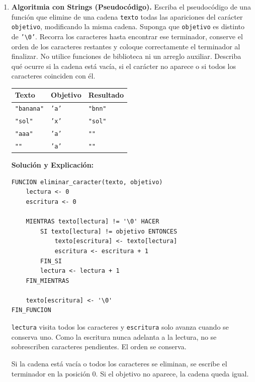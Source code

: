 \documentclass[11pt,letterpaper]{article}
\begin{document}
\begin{enumerate}[label=\textbf{\arabic*.}]
\begin{solucionbox}
    \textbf{Salida exacta:}
    \begin{lstlisting}[style=customc,numbers=none]
P1 I3 P3 I5 uno dos fin
    \end{lstlisting}
    Hay un espacio entre cada texto y un único salto de línea después de \texttt{fin}.
    \end{solucionbox}

    \newpage
    \item \textbf{Algoritmia con Strings (Pseudocódigo).}
    Escriba el pseudocódigo de una función que elimine de una cadena \texttt{texto} todas las apariciones del carácter \texttt{objetivo}, modificando la misma cadena. Suponga que \texttt{objetivo} es distinto de \texttt{'\textbackslash 0'}. Recorra los caracteres hasta encontrar ese terminador, conserve el orden de los caracteres restantes y coloque correctamente el terminador al finalizar. No utilice funciones de biblioteca ni un arreglo auxiliar. Describa qué ocurre si la cadena está vacía, si el carácter no aparece o si todos los caracteres coinciden con él.
    \begin{center}
    \begin{tabular}{lll}
    \toprule
    \textbf{Texto} & \textbf{Objetivo} & \textbf{Resultado} \\
    \midrule
    \texttt{"banana"} & \texttt{'a'} & \texttt{"bnn"} \\
    \texttt{"sol"} & \texttt{'x'} & \texttt{"sol"} \\
    \texttt{"aaa"} & \texttt{'a'} & \texttt{""} \\
    \texttt{""} & \texttt{'a'} & \texttt{""} \\
    \bottomrule
    \end{tabular}
    \end{center}
    \begin{solucionbox}
    \textbf{Solución y Explicación:}
    \begin{lstlisting}[style=pseudocodigo]
FUNCION eliminar_caracter(texto, objetivo)
    lectura <- 0
    escritura <- 0

    MIENTRAS texto[lectura] != '\0' HACER
        SI texto[lectura] != objetivo ENTONCES
            texto[escritura] <- texto[lectura]
            escritura <- escritura + 1
        FIN_SI
        lectura <- lectura + 1
    FIN_MIENTRAS

    texto[escritura] <- '\0'
FIN_FUNCION
    \end{lstlisting}
    \texttt{lectura} visita todos los caracteres y \texttt{escritura} solo avanza cuando se conserva uno. Como la escritura nunca adelanta a la lectura, no se sobrescriben caracteres pendientes. El orden se conserva.
    \par Si la cadena está vacía o todos los caracteres se eliminan, se escribe el terminador en la posición 0. Si el objetivo no aparece, la cadena queda igual.
    \end{solucionbox}


\end{enumerate}
\end{document}
